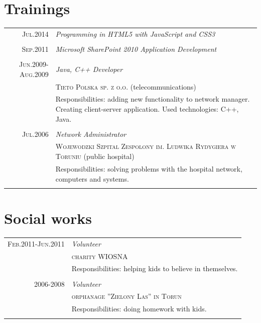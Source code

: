 \documentclass[a4paper,12pt]{article}
\begin{document}
\section{Trainings}
\begin{tabular}{r|p{11cm}}
	\textsc{Jul.2014}
	&\emph{Programming in HTML5 with JavaScript and CSS3} \\
	\multicolumn{2}{c}{} \\

	\textsc{Sep.2011}
	&\emph{Microsoft SharePoint 2010 Application Development} \\
	\multicolumn{2}{c}{} \\

	\textsc{Jun.2009-Aug.2009}
	&\emph{Java, C++ Developer} \\
	&\textsc{Tieto Polska sp. z o.o.} (telecommunications) \\
	&\footnotesize{Responsibilities: adding new functionality to network manager. Creating
				   client-server application. Used technologies: C++, Java.} \\
	\multicolumn{2}{c}{} \\

	\textsc{Jul.2006}
	&\emph{Network Administrator} \\
	&\textsc{Wojewodzki Szpital Zespolony im. Ludwika Rydygiera w Toruniu} (public hospital) \\
	&\footnotesize{Responsibilities: solving problems with the hospital network, computers and systems.} \\
	\multicolumn{2}{c}{} \\
\end{tabular}


\section{Social works}
\begin{tabular}{r|p{11cm}}
	\textsc{Feb.2011-Jun.2011}
	&\emph{Volunteer}\\
	&\textsc{charity WIOSNA}\\
	&\footnotesize{Responsibilities: helping kids to believe in themselves.}\\
	\multicolumn{2}{c}{}\\

	\textsc{2006-2008}
		&\emph{Volunteer}\\
		&\textsc{orphanage ''Zielony Las'' in Torun}\\
		&\footnotesize{Responsibilities: doing homework with kids.}\\
	\multicolumn{2}{c}{}\\
\end{tabular}
\end{document}
